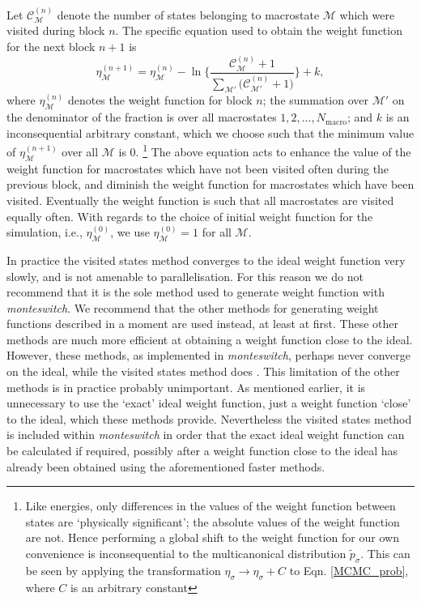 \documentclass{report}
\begin{document}
Let $\mathcal{C}^{(n)}_{\mathcal{M}}$ denote the number of states belonging to macrostate $\mathcal{M}$ which were visited during block $n$.
The specific equation used to obtain the weight function for the next block $n+1$ is
\begin{equation}
\eta^{(n+1)}_{\mathcal{M}}=\eta^{(n)}_{\mathcal{M}}-\ln\Biggl\lbrace
\frac{\mathcal{C}^{(n)}_{\mathcal{M}}+1}{\sum_{\mathcal{M}'}\bigl(\mathcal{C}^{(n)}_{\mathcal{M}'}+1\bigr)}
\Biggr\rbrace
+k,
\end{equation}
where $\eta^{(n)}_{\mathcal{M}}$ denotes the weight function for block $n$; the summation over $\mathcal{M}'$ on the denominator of the fraction is
over all macrostates $1,2,\dotsc,N_{\text{macro}}$; and $k$ is an inconsequential arbitrary constant, which we choose such that the minimum value of 
$\eta^{(n+1)}_{\mathcal{M}}$ over all $\mathcal{M}$ is 0.
\footnote{Like energies, only differences in the values of the weight function between states are `physically significant'; the absolute values 
of the weight function are not. Hence performing a global shift to the weight function for our own convenience is inconsequential to the
multicanonical distribution $\tilde{p}_{\sigma}$. This can be seen by applying the transformation $\eta_{\sigma}\to\eta_{\sigma}+C$ to Eqn. \eqref{MCMC_prob},
where $C$ is an arbitrary constant}
The above equation acts to enhance the value of the weight function for macrostates which have not been visited often during the previous block, and
diminish the weight function for macrostates which have been visited. Eventually the weight function is such that all macrostates are visited equally
often. 
With regards to the choice of initial weight function for the simulation, i.e., $\eta^{(0)}_{\mathcal{M}}$, we use $\eta^{(0)}_{\mathcal{M}}=1$
for all $\mathcal{M}$. 

In practice the visited states method converges to the ideal weight function very slowly, and is not amenable to parallelisation. 
For this reason we do not recommend that it is the sole method used to 
generate weight function with \emph{monteswitch}. We recommend that the other methods for generating weight functions described 
in a moment are used instead, at least at first. These other methods are much more efficient at obtaining a weight function close to the ideal. 
However, these methods, as implemented in \emph{monteswitch}, perhaps never converge on the ideal, while the visited states method does \cite{Smith_1995}. 
This limitation of the other methods is in practice probably
unimportant. As mentioned earlier, it is unnecessary to use the `exact' ideal weight function, just a weight function `close' to the ideal, which
these methods provide. Nevertheless the visited states method is included within \emph{monteswitch} in order that the exact ideal weight function can
be calculated if required, possibly after a weight function close to the ideal has already been obtained using the aforementioned faster methods.
\end{document}
